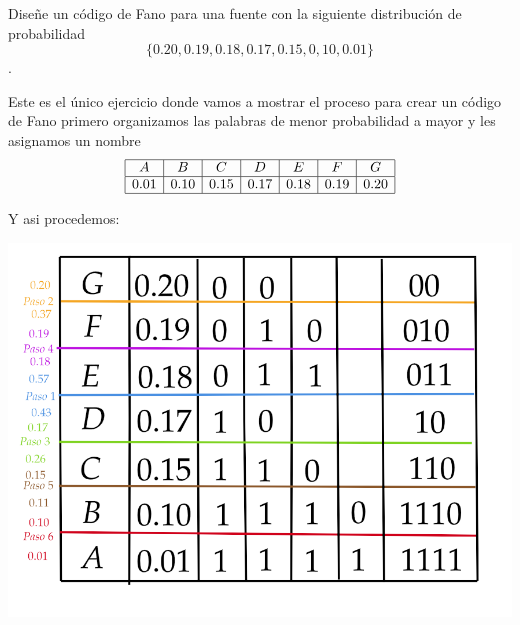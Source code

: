 
Diseñe un código de Fano para una fuente con la siguiente distribución de probabilidad $$\{0.20, 0.19, 0.18, 0.17, 0.15, 0,10, 0.01\}$$.
\begin{sol}
    Este es el único ejercicio donde vamos a mostrar el proceso para crear un código de Fano 
    primero organizamos las palabras de menor probabilidad a mayor y les asignamos un nombre
    $$
\begin{array}{|c|c|c|c|c|c|c|}
\hline
A & B & C & D & E & F & G\\
\hline
0.01& 0.10& 0.15& 0.17& 0.18& 0.19& 0.20\\
\hline

\end{array}
$$

    Y asi procedemos:\\
    \begin{center}
     \includegraphics[scale=0.6]{diagrama.png}
    \end{center}
   
\end{sol}